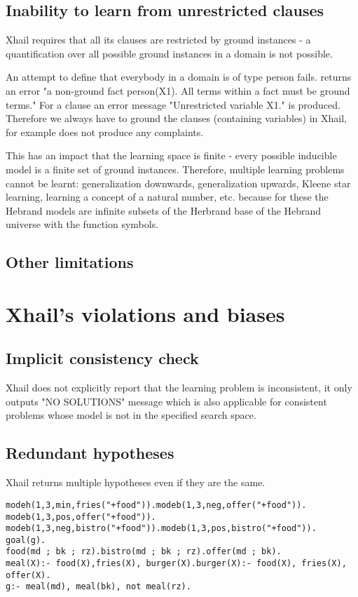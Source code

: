 \subsection{Inability to learn from unrestricted clauses}
Xhail requires that all its clauses are restricted by ground instances - a quantification over all possible ground instances in a domain is not possible.

An attempt to define that everybody in a domain is of type person fails.  returns an error "a non-ground fact person(X1). All terms within a fact must be ground terms." For a clause  an error message "Unrestricted variable X1." is produced. Therefore we always have to ground the clauses (containing variables) in Xhail, for example
 does not produce any complaints.

This has an impact that the learning space is finite - every possible inducible model is a finite set of ground instances. Therefore, multiple learning problems cannot be learnt: generalization downwards, generalization upwards, Kleene star learning, learning a concept of a natural number, etc. because for these the Hebrand models are infinite subsets of the Herbrand base of the Hebrand universe with the function symbols.
\subsection{Other limitations}

\section{Xhail's violations and biases}

\subsection{Implicit consistency check}
Xhail does not explicitly report that the learning problem is inconsistent, it only outputs "NO SOLUTIONS" message which is also applicable for consistent problems whose model is not in the specified search space.

\subsection{Redundant hypotheses}
Xhail returns multiple hypotheses even if they are the same.

\begin{lstlisting}
modeh(1,3,min,fries("+food")).modeb(1,3,neg,offer("+food")).
modeb(1,3,pos,offer("+food")).
modeb(1,3,neg,bistro("+food")).modeb(1,3,pos,bistro("+food")).
goal(g).
food(md ; bk ; rz).bistro(md ; bk ; rz).offer(md ; bk).
meal(X):- food(X),fries(X), burger(X).burger(X):- food(X), fries(X), offer(X).
g:- meal(md), meal(bk), not meal(rz).
\end{lstlisting}

